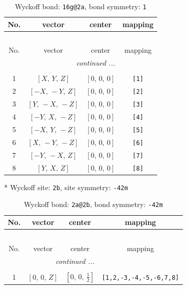 \documentclass[fleqn,8pt]{jsarticle}
\begin{document}
\renewcommand{\arraystretch}{1.2}
\begin{longtable}{cccc}
\caption{Wyckoff bond: {\tt 16g@2a}, bond symmetry: {\tt 1}}
 \\
 \hline \hline
No. & vector & center & mapping \\ \hline \endfirsthead

\multicolumn{3}{l}{\tablename\ \thetable{}} \\
 \hline \hline
No. & vector & center & mapping \\ \hline \endhead

 \hline \hline
\multicolumn{3}{r}{\footnotesize\it continued ...} \\ \endfoot

 \hline \hline
\multicolumn{3}{r}{} \\ \endlastfoot

1 & $\left[ X,\, Y,\, Z \right]$ & $\left[ 0,\, 0,\, 0 \right]$ & {\tt [1]} \\ \hline
2 & $\left[ - X,\, - Y,\, Z \right]$ & $\left[ 0,\, 0,\, 0 \right]$ & {\tt [2]} \\ \hline
3 & $\left[ Y,\, - X,\, - Z \right]$ & $\left[ 0,\, 0,\, 0 \right]$ & {\tt [3]} \\ \hline
4 & $\left[ - Y,\, X,\, - Z \right]$ & $\left[ 0,\, 0,\, 0 \right]$ & {\tt [4]} \\ \hline
5 & $\left[ - X,\, Y,\, - Z \right]$ & $\left[ 0,\, 0,\, 0 \right]$ & {\tt [5]} \\ \hline
6 & $\left[ X,\, - Y,\, - Z \right]$ & $\left[ 0,\, 0,\, 0 \right]$ & {\tt [6]} \\ \hline
7 & $\left[ - Y,\, - X,\, Z \right]$ & $\left[ 0,\, 0,\, 0 \right]$ & {\tt [7]} \\ \hline
8 & $\left[ Y,\, X,\, Z \right]$ & $\left[ 0,\, 0,\, 0 \right]$ & {\tt [8]} \\
\end{longtable}
* Wyckoff site: {\tt 2b}, site symmetry: {\tt -42m}
\renewcommand{\arraystretch}{1.2}
\begin{longtable}{cccc}
\caption{Wyckoff bond: {\tt 2a@2b}, bond symmetry: {\tt -42m}}
 \\
 \hline \hline
No. & vector & center & mapping \\ \hline \endfirsthead

\multicolumn{3}{l}{\tablename\ \thetable{}} \\
 \hline \hline
No. & vector & center & mapping \\ \hline \endhead

 \hline \hline
\multicolumn{3}{r}{\footnotesize\it continued ...} \\ \endfoot

 \hline \hline
\multicolumn{3}{r}{} \\ \endlastfoot

1 & $\left[ 0,\, 0,\, Z \right]$ & $\left[ 0,\, 0,\, \frac{1}{2} \right]$ & {\tt [1,2,-3,-4,-5,-6,7,8]} \\
\end{longtable}
\end{document}

